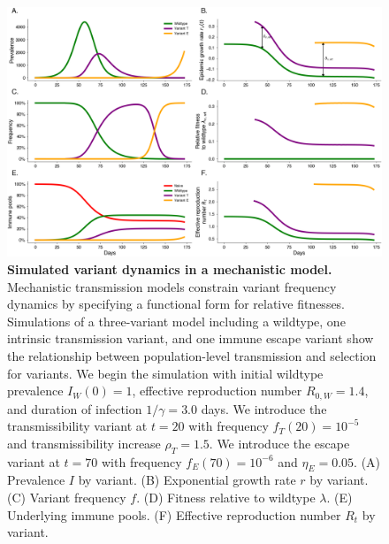 \documentclass[11pt,oneside,letterpaper]{article}
\newcommand{\wt}{W}
\newcommand{\varEscape}{\eta}
\newcommand{\varTransmission}{\rho}
\begin{document}
\begin{figure}[h]
    \centering
    \includegraphics[width=1.0\linewidth]{./figures/vis_mechanisms.png}
    \caption{
      \textbf{Simulated variant dynamics in a mechanistic model.}
      Mechanistic transmission models constrain variant frequency dynamics by specifying a functional form for relative fitnesses.
      Simulations of a three-variant model including a wildtype, one intrinsic transmission variant, and one immune escape variant show the relationship between population-level transmission and selection for variants.
      We begin the simulation with initial wildtype prevalence $I_\wt(0) = 1$, effective reproduction number $R_{0,\wt} = 1.4$, and duration of infection $1/\gamma = 3.0$ days.
      We introduce the transmissibility variant at $t=20$ with frequency $f_T(20) = 10^{-5}$ and transmissibility increase $\varTransmission_T = 1.5$.
      We introduce the escape variant at $t=70$ with frequency $f_E(70) = 10^{-6}$ and $\varEscape_E = 0.05$.
      (A) Prevalence $I$ by variant.
      (B) Exponential growth rate $r$ by variant.
      (C) Variant frequency $f$.
      (D) Fitness relative to wildtype $\lambda$.
      (E) Underlying immune pools.
      (F) Effective reproduction number $R_t$ by variant.
    }
    \label{fig:vis_mechanisms}
\end{figure}

\end{document}
